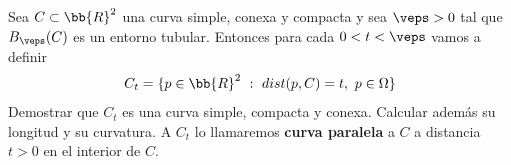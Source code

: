 
\begin{ejercicio}
    Sea $C\subset \bb{R}^2$ una curva simple, conexa y compacta y sea $\veps>0$ tal que $B_\veps(C)$ es un entorno tubular. Entonces para cada $0<t<\veps$ vamos a definir
    \begin{gather*}
        C_t = \{p\in \bb{R}^2 \ : \ dist(p,C)=t,\ p\in \Omega\}
    \end{gather*}
    Demostrar que $C_t$ es una curva simple, compacta y conexa. Calcular además su longitud y su curvatura. A $C_t$ lo llamaremos \textbf{curva paralela} a $C$ a distancia $t>0$ en el interior de $C$.\\


\end{ejercicio}
